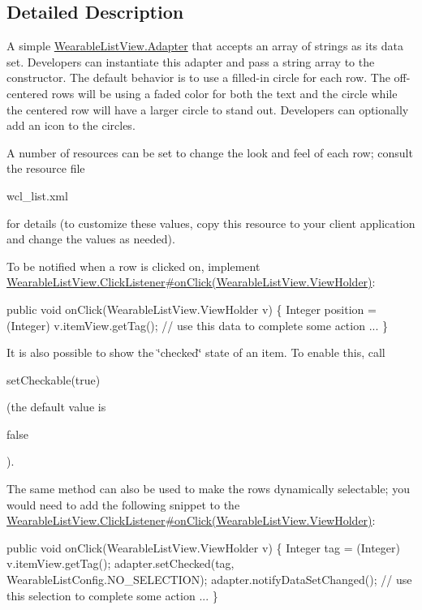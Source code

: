 \subsection{Detailed Description}
A simple \hyperlink{}{Wearable\+List\+View.\+Adapter} that accepts an array of strings as its data set. Developers can instantiate this adapter and pass a string array to the constructor. The default behavior is to use a filled-\/in circle for each row. The off-\/centered rows will be using a faded color for both the text and the circle while the centered row will have a larger circle to stand out. Developers can optionally add an icon to the circles.

A number of resources can be set to change the look and feel of each row; consult the resource file
\begin{DoxyCode}
wcl\_list.xml 
\end{DoxyCode}
 for details (to customize these values, copy this resource to your client application and change the values as needed).

To be notified when a row is clicked on, implement \hyperlink{}{Wearable\+List\+View.\+Click\+Listener\#on\+Click(\+Wearable\+List\+View.\+View\+Holder)}\+: 
\begin{DoxyPre}
  public void onClick(WearableListView.ViewHolder v) \{
       Integer position = (Integer) v.itemView.getTag();
       // use this data to complete some action ...
   \}
\end{DoxyPre}


It is also possible to show the \char`\"{}checked\char`\"{} state of an item. To enable this, call 
\begin{DoxyCode}
setCheckable(\textcolor{keyword}{true}) 
\end{DoxyCode}
 (the default value is
\begin{DoxyCode}
\textcolor{keyword}{false} 
\end{DoxyCode}
 ).

The same method can also be used to make the rows dynamically selectable; you would need to add the following snippet to the \hyperlink{}{Wearable\+List\+View.\+Click\+Listener\#on\+Click(\+Wearable\+List\+View.\+View\+Holder)}\+: 
\begin{DoxyPre}
       public void onClick(WearableListView.ViewHolder v) \{
           Integer tag = (Integer) v.itemView.getTag();
           adapter.setChecked(tag, WearableListConfig.NO\_SELECTION);
           adapter.notifyDataSetChanged();
           // use this selection to complete some action ...
       \}
\end{DoxyPre}


